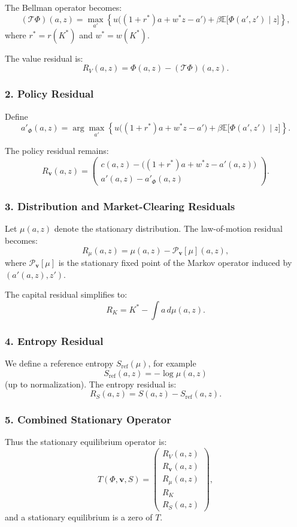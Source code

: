 \documentclass[12pt]{article}
\begin{document}
The Bellman operator becomes:
\[
(\mathcal{T}\Phi)(a,z)
=
\max_{a'}
\left\{
    u\big((1+r^\ast)a + w^\ast z - a'\big)
    + \beta \mathbb{E}\big[\Phi(a',z')\mid z\big]
\right\},
\]
where $r^\ast = r(K^\ast)$ and $w^\ast = w(K^\ast)$.

The value residual is:
\[
R_V(a,z)
=
\Phi(a,z) - (\mathcal{T}\Phi)(a,z).
\]

\subsubsection*{2. Policy Residual}

Define
\[
a'_\Phi(a,z)
=
\arg\max_{a'}
\left\{
    u\big((1+r^\ast)a + w^\ast z - a'\big)
    + \beta \mathbb{E}\big[\Phi(a',z')\mid z\big]
\right\}.
\]

The policy residual remains:
\[
R_{\mathbf{v}}(a,z)
=
\begin{pmatrix}
c(a,z) - \big((1+r^\ast)a + w^\ast z - a'(a,z)\big) \\
a'(a,z) - a'_\Phi(a,z)
\end{pmatrix}.
\]

\subsubsection*{3. Distribution and Market-Clearing Residuals}

Let $\mu(a,z)$ denote the stationary distribution. The law-of-motion
residual becomes:
\[
R_\mu(a,z)
=
\mu(a,z) - \mathcal{P}_{\mathbf{v}}[\mu](a,z),
\]
where $\mathcal{P}_{\mathbf{v}}[\mu]$ is the stationary fixed point of
the Markov operator induced by $(a'(a,z),z')$.

The capital residual simplifies to:
\[
R_K
=
K^\ast - \int a\, d\mu(a,z).
\]

\subsubsection*{4. Entropy Residual}

We define a reference entropy $S_{\text{ref}}(\mu)$, for example
\[
S_{\text{ref}}(a,z) = -\log \mu(a,z)
\]
(up to normalization). The entropy residual is:
\[
R_S(a,z)
=
S(a,z) - S_{\text{ref}}(a,z).
\]

\subsubsection*{5. Combined Stationary Operator}

Thus the stationary equilibrium operator is:
\[
T(\Phi,\mathbf{v},S)
=
\begin{pmatrix}
R_V(a,z) \\
R_{\mathbf{v}}(a,z) \\
R_\mu(a,z) \\
R_K \\
R_S(a,z)
\end{pmatrix},
\]
and a stationary equilibrium is a zero of $T$.
\end{document}
